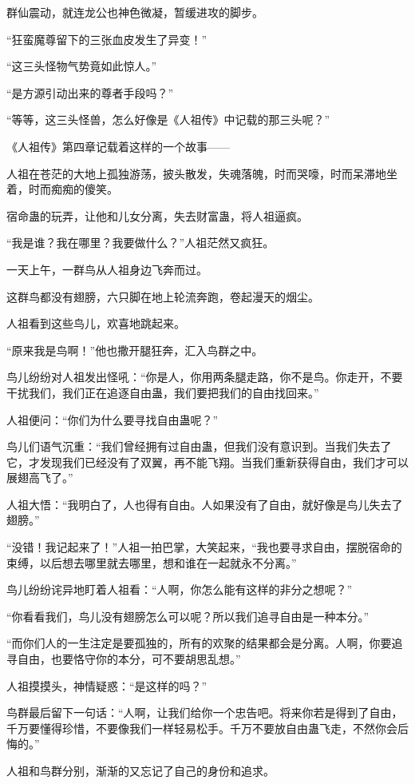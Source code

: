 \begin{this_body}
群仙震动，就连龙公也神色微凝，暂缓进攻的脚步。

“狂蛮魔尊留下的三张血皮发生了异变！”

“这三头怪物气势竟如此惊人。”

“是方源引动出来的尊者手段吗？”

“等等，这三头怪兽，怎么好像是《人祖传》中记载的那三头呢？”

《人祖传》第四章记载着这样的一个故事——

人祖在苍茫的大地上孤独游荡，披头散发，失魂落魄，时而哭嚎，时而呆滞地坐着，时而痴痴的傻笑。

宿命蛊的玩弄，让他和儿女分离，失去财富蛊，将人祖逼疯。

“我是谁？我在哪里？我要做什么？”人祖茫然又疯狂。

一天上午，一群鸟从人祖身边飞奔而过。

这群鸟都没有翅膀，六只脚在地上轮流奔跑，卷起漫天的烟尘。

人祖看到这些鸟儿，欢喜地跳起来。

“原来我是鸟啊！”他也撒开腿狂奔，汇入鸟群之中。

鸟儿纷纷对人祖发出怪吼：“你是人，你用两条腿走路，你不是鸟。你走开，不要干扰我们，我们正在追逐自由蛊，我们要把我们的自由找回来。”

人祖便问：“你们为什么要寻找自由蛊呢？”

鸟儿们语气沉重：“我们曾经拥有过自由蛊，但我们没有意识到。当我们失去了它，才发现我们已经没有了双翼，再不能飞翔。当我们重新获得自由，我们才可以展翅高飞了。”

人祖大悟：“我明白了，人也得有自由。人如果没有了自由，就好像是鸟儿失去了翅膀。”

“没错！我记起来了！”人祖一拍巴掌，大笑起来，“我也要寻求自由，摆脱宿命的束缚，以后想去哪里就去哪里，想和谁在一起就永不分离。”

鸟儿纷纷诧异地盯着人祖看：“人啊，你怎么能有这样的非分之想呢？”

“你看看我们，鸟儿没有翅膀怎么可以呢？所以我们追寻自由是一种本分。”

“而你们人的一生注定是要孤独的，所有的欢聚的结果都会是分离。人啊，你要追寻自由，也要恪守你的本分，可不要胡思乱想。”

人祖摸摸头，神情疑惑：“是这样的吗？”

鸟群最后留下一句话：“人啊，让我们给你一个忠告吧。将来你若是得到了自由，千万要懂得珍惜，不要像我们一样轻易松手。千万不要放自由蛊飞走，不然你会后悔的。”

人祖和鸟群分别，渐渐的又忘记了自己的身份和追求。


\end{this_body}

